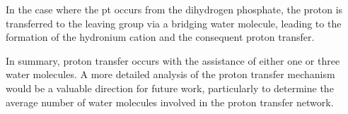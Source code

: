 In the case where the \ac{pt} occurs from the dihydrogen phosphate, the proton is transferred to the leaving group via a bridging water molecule, leading to the formation of the hydronium cation and the consequent proton transfer.

In summary, proton transfer occurs with the assistance of either one or three water molecules. A more detailed analysis of the proton transfer mechanism would be a valuable direction for future work, particularly to determine the average number of water molecules involved in the proton transfer network.
